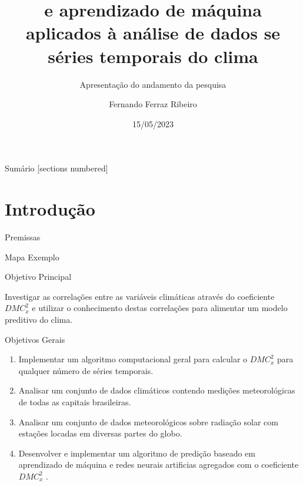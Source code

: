 \documentclass[10pt]{beamer}
\title{\dmc e aprendizado de máquina aplicados à análise de dados se séries temporais do clima}
\subtitle{Apresentação do andamento da pesquisa}
\date{15/05/2023}
\author{Fernando Ferraz Ribeiro}
\institute{UEFS PPGM}
\newcommand{\dmc}{\(DMC_x^2\) }
\begin{document}
\maketitle

\begin{frame}{Sumário}
  [sections numbered]
  \tableofcontents[hideallsubsections]
\end{frame}

\section{Introdução}

\begin{frame}[fragile]{Premissas}

  

\end{frame}

\begin{frame}{Mapa Exemplo}


  
\end{frame}

\begin{frame}{Objetivo Principal}

  Investigar as correlações entre as variáveis climáticas através do coeficiente \dmc e utilizar o conhecimento destas correlações para alimentar um modelo preditivo do clima.

  
\end{frame}

\begin{frame}{Objetivos Gerais}

  \begin{enumerate}
    \label{enum:obj_espec}
    \item Implementar um algoritmo computacional geral para calcular o \dmc para qualquer número de séries temporais.
    \item Analisar um conjunto de dados climáticos contendo medições meteorológicas de todas as capitais brasileiras.
    \item Analisar um conjunto de dados meteorológicos sobre radiação solar com estações locadas em diversas partes do globo.
    \item Desenvolver e implementar um algoritmo de predição baseado em aprendizado de máquina e redes neurais artificias agregados com o coeficiente \dmc.
\end{enumerate}

\end{frame}
\end{document}
